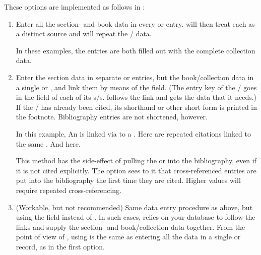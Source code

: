\documentclass{ltxdockit}[2010/02/12]
\begin{document}
These options are implemented as follows in :

\begin{enumerate}
\item Enter all the section- and book data in every  or  entry.  will then treat each as a distinct source and will repeat the / data.

In these examples, the  entries are both filled out with the complete collection data.\autocites[][]{hp:ratcliff2007duchesnes-straw,de-renzi2007resemblance-pat}

\item Enter the section data in separate  or  entries, but the book/collection data in a single  or , and link them by means of the  field. 
(The entry key of the / goes in the  field of each of its s/s.  follows the link and gets the data that it needs.)
 If the / has already been cited, its shorthand or other short form is printed in the footnote. Bibliography entries are not shortened, however.

In this example, An  is linked via  to a .\autocites[][]{hp:wilson2007erasmus-darwin-x}
Here are repeated citations linked to the same .\autocites[][]{hp:ratcliff2007duchesnes-straw-x} And here.\autocites[][]{hp:sabean2007from-clan-to-x} 

This method has the side-effect of pulling the  or  into the bibliography, even if it is not cited explicitly. The  option  sees to it that cross-referenced entries are put into the bibliography the first time they are cited. Higher values will require repeated cross-referencing.

\item (Workable, but not recommended) Same data entry procedure as above, but using the  field instead of . In such cases,  relies on your \bibtex database to follow the links and supply the section- and book/collection data together. From the point of view of , using  is the same as entering all the data in a single  or  record, as in the first option. 


\end{enumerate}
\end{document}
